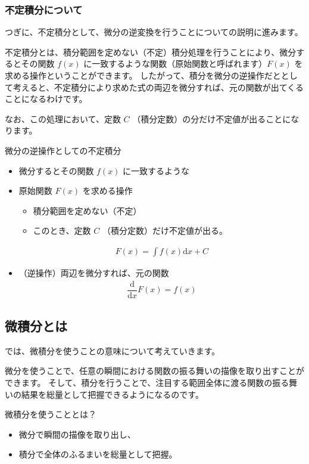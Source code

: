 \documentclass[uplatex,dvipdfmx,a4paper,11pt]{jsarticle}
\begin{document}
\subsubsection{不定積分について}
つぎに、不定積分として、微分の逆変換を行うことについての説明に進みます。

不定積分とは、積分範囲を定めない（不定）積分処理を行うことにより、微分するとその関数 $f(x)$ に一致するような関数（原始関数と呼ばれます）$F(x)$ を求める操作ということができます。
したがって、積分を微分の逆操作だととして考えると、不定積分により求めた式の両辺を微分すれば、元の関数が出てくることになるわけです。

なお、この処理において、定数 $C$ （積分定数）の分だけ不定値が出ることになります。

\large
\begin{itembox}[l]{微分の逆操作としての不定積分}
	\begin{itemize}
		\item 微分するとその関数 $f(x)$ に一致するような
		\item 原始関数 $F(x)$ を求める操作
		\begin{itemize}
			\item 積分範囲を定めない（不定）
			\item このとき、定数 $C$ （積分定数）だけ不定値が出る。
		\end{itemize}
			\begin{align*}
				F(x) = \int f(x) \mathrm{d} x +C
			\end{align*}
		\item （逆操作）両辺を微分すれば、元の関数
			\begin{align*}
				\dfrac{\mathrm{d}}{\mathrm{d} x} F(x) = f(x)
			\end{align*}
	\end{itemize}
\end{itembox}
\normalsize

\subsection{微積分とは}

では、微積分を使うことの意味について考えていきます。

微分を使うことで、任意の瞬間における関数の振る舞いの描像を取り出すことができます。
そして、積分を行うことで、注目する範囲全体に渡る関数の振る舞いの結果を総量として把握できるようになるのです。

\large
	\begin{itembox}[l]{微積分を使うこととは？}
		\begin{itemize}
			\item 微分で瞬間の描像を取り出し、
			\item 積分で全体のふるまいを総量として把握。
		\end{itemize}
	\end{itembox}
\normalsize
\end{document}
